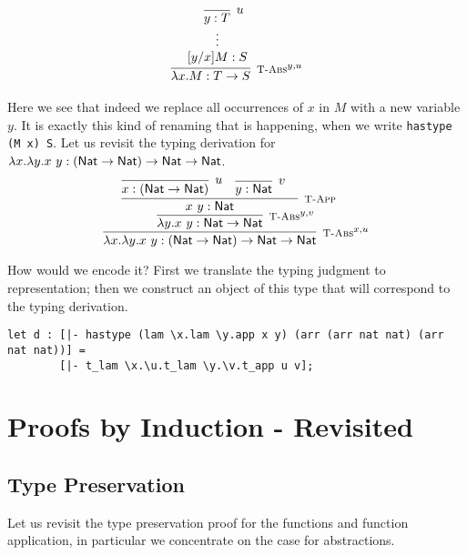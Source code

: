 \[
\begin{array}{c}
\infer[\TFn^{y,u}]{\lam x.M : T \arrow S}
                 {\hypo{\quad\infer[u]{y:T}{}}{[y/x]M:S}}
\end{array}
\]

Here we see that indeed we replace all occurrences of $x$ in $M$ with a new
variable $y$. It is exactly this kind of renaming that is happening, when we
write \lstinline!hastype (M x) S!.
Let us revisit the typing derivation for $\lambda x.\lambda y.x~y : (\textsf{Nat} \rightarrow
\textsf{Nat}) \rightarrow \textsf{Nat} \rightarrow \textsf{Nat}$.
\[
\infer[\TFn^{x,u}]{\lam x.\lam y.x~y : (\Nat \arrow \Nat) \arrow \Nat \arrow \Nat}
 {\infer[\TFn^{y,v}]{\lam y.x~y :  \Nat  \arrow \Nat}
           {\infer[\TApp]{x~y :\Nat}
                      {\infer[u]{x: (\Nat \arrow \Nat) }{} &
                        \infer[v]{ y: \Nat }{} &
                      }
                    }
                  }
\]

How would we encode it? First we translate the
typing judgment to representation;
then we construct an object of this type that will correspond to the typing
derivation. %
%

\begin{lstlisting}
let d : [|- hastype (lam \x.lam \y.app x y) (arr (arr nat nat) (arr nat nat))] =
        [|- t_lam \x.\u.t_lam \y.\v.t_app u v];
\end{lstlisting}



\chapter{Proofs by Induction - Revisited}\label{chap:proofs-intermediate}
\section{Type Preservation}\label{chap:proofs-closed-derivations}

Let us revisit the type preservation proof for the functions and
function application, in particular we concentrate on the case for
abstractions.

